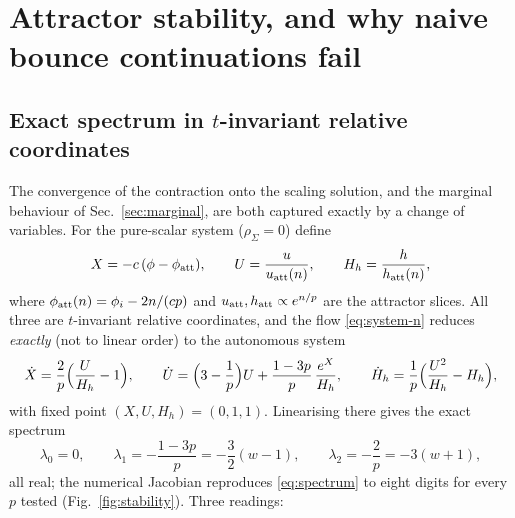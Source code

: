 \documentclass[11pt,a4paper]{article}
\newcommand{\rhoSigma}{\rho_\Sigma}
\begin{document}
\section{Attractor stability, and why naive bounce continuations fail}
\label{sec:stability}

\subsection{Exact spectrum in $t$-invariant relative coordinates}
\label{sec:spectrum}

The convergence of the contraction onto the scaling solution, and the
marginal behaviour of Sec.~\ref{sec:marginal}, are both captured exactly by
a change of variables. For the pure-scalar system ($\rhoSigma=0$) define
\begin{equation}
  X=-c\,(\phi-\phi_{\rm att}),\qquad
  U=\frac{u}{u_{\rm att}(n)},\qquad
  H_h=\frac{h}{h_{\rm att}(n)},
  \label{eq:scaled}
\end{equation}
where $\phi_{\rm att}(n)=\phi_i-2n/(cp)$ and
$u_{\rm att},h_{\rm att}\propto e^{n/p}$ are the attractor slices. All
three are $t$-invariant relative coordinates, and the flow
\eqref{eq:system-n} reduces \emph{exactly} (not to linear order) to the
autonomous system
\begin{equation}
  \dot X=\frac{2}{p}\Bigl(\frac{U}{H_h}-1\Bigr),\qquad
  \dot U=\Bigl(3-\frac1p\Bigr)U+\frac{1-3p}{p}\,\frac{e^{X}}{H_h},\qquad
  \dot H_h=\frac{1}{p}\Bigl(\frac{U^2}{H_h}-H_h\Bigr),
  \label{eq:scaled-system}
\end{equation}
with fixed point $(X,U,H_h)=(0,1,1)$. Linearising there gives the exact
spectrum
\begin{equation}
  \lambda_0=0,\qquad
  \lambda_1=-\frac{1-3p}{p}=-\frac{3}{2}(w-1),\qquad
  \lambda_2=-\frac{2}{p}=-3(w+1),
  \label{eq:spectrum}
\end{equation}
all real; the numerical Jacobian reproduces \eqref{eq:spectrum} to eight
digits for every $p$ tested (Fig.~\ref{fig:stability}). Three readings:
\end{document}
